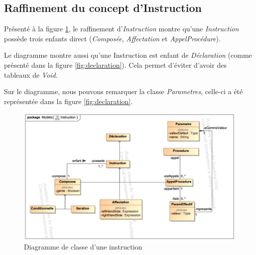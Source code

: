 
\subsection{Raffinement du concept d'Instruction}
\label{sec:question9}

Présenté à la figure \ref{fig:instruction}, le raffinement d'\emph{Instruction} montre qu'une \emph{Instruction} possède trois enfants direct (\emph{Composée}, \emph{Affectation} et \emph{AppelProcédure}).

Le diagramme montre aussi qu'une Instruction est enfant de \emph{Déclaration} (comme présenté dans la figure \ref{fig:declaration}). Cela permet d'éviter d'avoir des tableaux de \emph{Void}.

Sur le diagramme, nous pouvons remarquer la classe \emph{Parametres}, celle-ci a été représentée dans la figure \ref{fig:declaration}.  

\begin{figure}
	\centering
	\includegraphics[width=500pt]{assets/class__Instruction}
	\caption{Diagramme de classe d'une instruction}
	\label{fig:instruction}
\end{figure}

